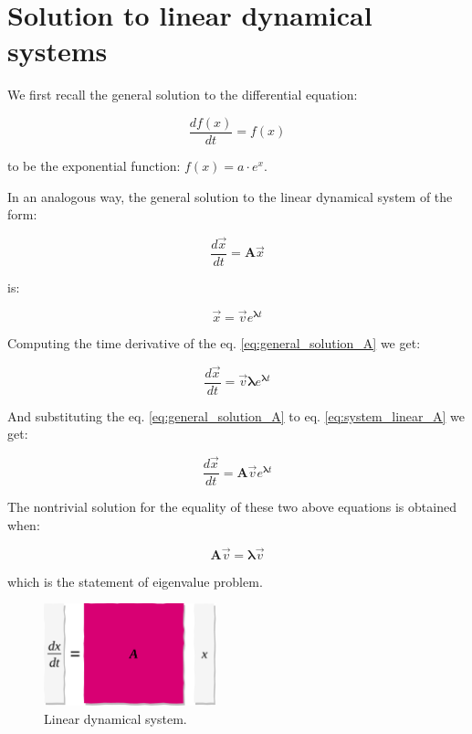 \documentclass[10pt,twocolumn]{article}
\begin{document}
\section{Solution to linear dynamical systems} \label{app:A}

We first recall the general solution to the differential equation:

\begin{equation} \label{eq:DE_exp}
\frac{d f(x)}{dt} = f(x)
\end{equation}

to be the exponential function: $f(x) = a \cdot e^{x}$.


In an analogous way, the general solution to the linear dynamical system of the form:

\begin{equation} \label{eq:system_linear_A}
\frac{d \vec{x}}{dt} = \bm{A} \vec{x}
\end{equation}

is:

\begin{equation} \label{eq:general_solution_A}
\vec{x} = \vec{v} e^{\bm{\lambda} t}
\end{equation}

Computing the time derivative of the eq. \ref{eq:general_solution_A} we get:

\begin{equation} \label{eq:sub1}
\frac{d \vec{x}}{dt} = \vec{v} \bm{\lambda} e^{\bm{\lambda} t}
\end{equation}

And substituting the eq. \ref{eq:general_solution_A} to eq. \ref{eq:system_linear_A} we get:

\begin{equation} \label{eq:sub2}
\frac{d \vec{x}}{dt} = \bm{A} \vec{v} e^{\bm{\lambda} t}
\end{equation}

The nontrivial solution for the equality of these two above equations is obtained when:

\begin{equation} \label{eq:eigval}
\bm{A} \vec{v} = \bm{\lambda} \vec{v} 
\end{equation}

which is the statement of eigenvalue problem.



\begin{figure}[H]
\centering\includegraphics[width=5cm]{lin-dyn.png}
\caption{Linear dynamical system.}
\label{fig:linear_system}
\end{figure}
\end{document}
